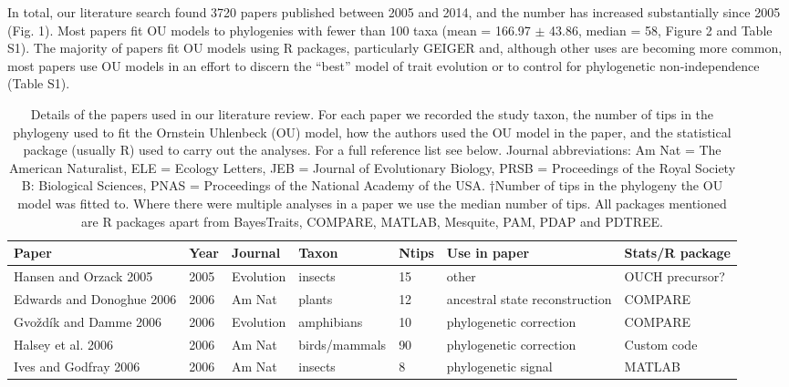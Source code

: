     In total, our literature search found 3720 papers published between 2005 and 2014, and the number has increased substantially since 2005 (Fig. 1). 
    Most papers fit OU models to phylogenies with fewer than 100 taxa (mean = 166.97 $\pm$ 43.86, median = 58, Figure 2 and Table S1). 
    The majority of papers fit OU models using R packages, particularly GEIGER and, although other uses are becoming more common, most papers use OU models in an effort to discern the ``best'' model of trait evolution or to control for phylogenetic non-independence (Table S1). 

\begin{landscape}
\begin{center}
\begin{longtable}{p{6cm}llllll}
\caption[Literature review]
        {Details of the papers used in our literature review. For each paper we recorded the study taxon, the number of tips in the phylogeny used to fit the Ornstein Uhlenbeck (OU) model, how the authors used the OU model in the paper, and the statistical package (usually R) used to carry out the analyses. For a full reference list see below. Journal abbreviations: Am Nat = The American Naturalist, ELE = Ecology Letters, JEB = Journal of Evolutionary Biology, PRSB = Proceedings of the Royal Society B: Biological Sciences, PNAS = Proceedings of the National Academy of the USA. †Number of tips in the phylogeny the OU model was fitted to. Where there were multiple analyses in a paper we use the median number of tips.  All packages mentioned are R packages apart from BayesTraits, COMPARE, MATLAB, Mesquite, PAM, PDAP and PDTREE.}\\
\bigskip        
\hline
\textbf{Paper}  &   \textbf{Year}    &   \textbf{Journal} &   \textbf{Taxon}   &   \textbf{Ntips}   &   \textbf{Use in paper}   &   \textbf{Stats/R package} \\
\hline
Hansen and Orzack 2005    &   2005    &   Evolution   &   insects &   15  &   other   &   OUCH precursor? \\
Edwards and Donoghue 2006     &   2006    &   Am Nat  &   plants  &   12  &   ancestral state reconstruction  &   COMPARE \\
Gvo\v{z}d\'{i}k and Damme 2006    &   2006    &   Evolution   &   amphibians  &   10  &   phylogenetic correction &   COMPARE \\
Halsey et al. 2006    &   2006    &   Am Nat  &   birds/mammals   &   90  &   phylogenetic correction &   Custom code \\
Ives and Godfray 2006 &   2006    &   Am Nat  &   insects &   8   &   phylogenetic signal &   MATLAB  \\

\end{longtable}
\end{center}
\end{landscape}
